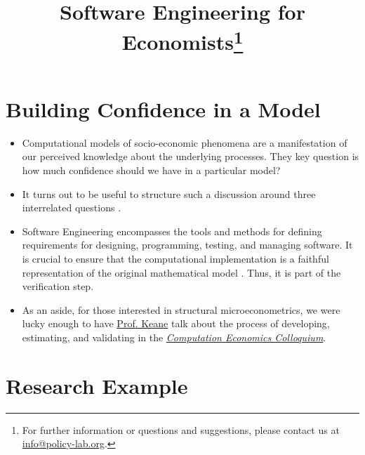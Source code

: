 
\title{Software Engineering for Economists\thanks{For further information or questions and suggestions, please contact us at \href{mailto: info@policy-lab.org}{info@policy-lab.org}.}}
\author{ }\date{ } 


\section{Building Confidence in a Model}

\begin{itemize}
\item Computational models of socio-economic phenomena are a manifestation of our perceived knowledge about the underlying processes. They key question is how much confidence should we have in a particular model? 
\item  It turns out to be useful to structure such a discussion around three interrelated questions \citet{Council.2012}.
\item  Software Engineering encompasses the tools and methods for defining requirements for designing, programming, testing, and managing software. It is crucial to ensure that the computational implementation is a faithful representation of the original mathematical model \citet{Oberkampf.2010}. Thus, it is part of the verification step.
\item As an aside, for those interested in structural microeconometrics, we were lucky enough to have \href{http://www.economics.ox.ac.uk/Academic/michael-keane}{Prof. Keane} talk about the process of developing, estimating, and validating in the \href{http://bfi.uchicago.edu/events/computational-economics-colloquium}{\textit{Computation Economics Colloquium}}.
\end{itemize}
\section{Research Example}


